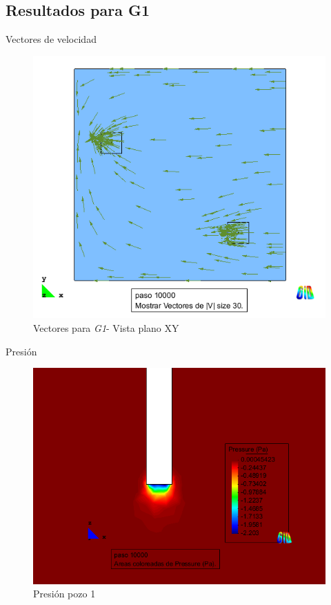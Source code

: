\documentclass[spanish]{beamer}
\begin{document}
\subsection{Resultados para G1}
\begin{frame}{Vectores de velocidad}
\begin{center}
\begin{figure}[htbp]
\centerline{\includegraphics[scale=0.4]{../img/100m/resul/100_xy_vectores}}
\caption{Vectores para \emph{G1}- Vista plano XY}
\end{figure}
\end{center}
\end{frame}
%
\begin{frame}{Presión}
\begin{center}
\begin{figure}[htbp]
\centerline{\includegraphics[scale=0.3]{../img/100m/resul/100_XZ_presion_corte_centro_pozo1}}
\caption{Presión pozo 1}
\end{figure}
\end{center}
\end{frame}
\end{document}
